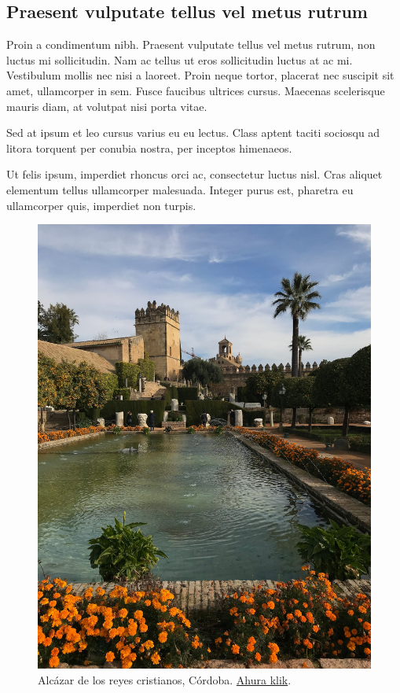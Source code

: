 \subsection{Praesent vulputate tellus vel metus rutrum}

Proin a condimentum nibh. Praesent vulputate tellus vel metus rutrum, non luctus mi sollicitudin. Nam ac tellus ut eros sollicitudin luctus at ac mi. Vestibulum mollis nec nisi a laoreet. Proin neque tortor, placerat nec suscipit sit amet, ullamcorper in sem. Fusce faucibus ultrices cursus. Maecenas scelerisque mauris diam, at volutpat nisi porta vitae. 

Sed at ipsum et leo cursus varius eu eu lectus. Class aptent taciti sociosqu ad litora torquent per conubia nostra, per inceptos himenaeos. 

Ut felis ipsum, imperdiet rhoncus orci ac, consectetur luctus nisl. Cras aliquet elementum tellus ullamcorper malesuada. Integer purus est, pharetra eu ullamcorper quis, imperdiet non turpis. \cite{SOFTWARE_ENGINEERING_9}




\begin{figure}[!hp]
    \centering
    \includegraphics[width=\linewidth]{figures/examples/Alcazar_Cordoba.jpg}
    \caption{Alcázar de los reyes cristianos, Córdoba. \href{https://es.wikipedia.org/wiki/Archivo:Alcazar_Cordoba.jpg}{Ahura klik}.}
    \label{fig:apxA:cordoba}
\end{figure}



